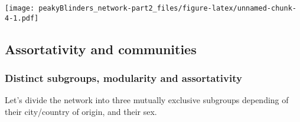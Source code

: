 \documentclass[
]{article}
\begin{document}
\texttt{[image: peakyBlinders\_network-part2\_files/figure-latex/unnamed-chunk-4-1.pdf]}

\hypertarget{assortativity-and-communities}{%
\subsection{Assortativity and
communities}\label{assortativity-and-communities}}

\hypertarget{distinct-subgroups-modularity-and-assortativity}{%
\subsubsection{Distinct subgroups, modularity and
assortativity}\label{distinct-subgroups-modularity-and-assortativity}}

Let's divide the network into three mutually exclusive subgroups
depending of their city/country of origin, and their sex.
\end{document}
